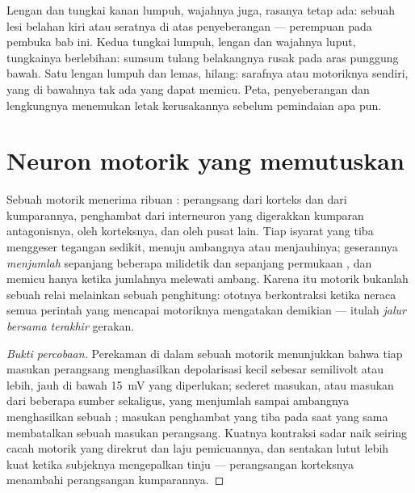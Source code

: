 \begin{example}\label{ex:g12:brain-and-movement:paralysis}
Lengan dan tungkai kanan lumpuh, wajahnya juga, rasanya tetap ada:
sebuah lesi  belahan kiri atau seratnya di atas
penyeberangan --- perempuan pada pembuka bab ini. Kedua tungkai lumpuh,
lengan dan wajahnya luput,  tungkainya berlebihan: sumsum tulang
belakangnya rusak pada aras punggung bawah. Satu lengan lumpuh dan
lemas,  hilang: sarafnya atau  motoriknya sendiri, yang
di bawahnya tak ada yang dapat memicu. Peta, penyeberangan dan
lengkungnya menemukan letak kerusakannya sebelum pemindaian apa pun.
\end{example}

\section{Neuron motorik yang memutuskan}

\begin{proposition}\label{prop:g12:brain-and-movement:integration}
Sebuah  motorik menerima ribuan :  perangsang
dari korteks dan dari kumparannya,  penghambat dari interneuron
yang digerakkan kumparan antagonisnya, oleh korteksnya, dan oleh pusat
lain. Tiap isyarat yang tiba menggeser tegangan  sedikit,
menuju ambangnya atau menjauhinya; geserannya \emph{menjumlah}
sepanjang beberapa milidetik dan sepanjang permukaan , dan
 memicu hanya ketika jumlahnya melewati ambang. Karena itu
 motorik bukanlah sebuah relai melainkan sebuah penghitung:
ototnya berkontraksi ketika neraca semua perintah yang mencapai 
motoriknya mengatakan demikian --- itulah \emph{jalur bersama
terakhir} gerakan.
\end{proposition}
\begin{proof}[Bukti percobaan]
Perekaman di dalam sebuah  motorik menunjukkan bahwa tiap
masukan perangsang menghasilkan depolarisasi kecil sebesar semilivolt
atau lebih, jauh di bawah \qty{15}{mV} yang diperlukan; sederet masukan,
atau masukan dari beberapa sumber sekaligus, yang menjumlah sampai
ambangnya menghasilkan sebuah ; masukan penghambat yang
tiba pada saat yang sama membatalkan sebuah masukan perangsang. Kuatnya
kontraksi sadar naik seiring cacah  motorik yang direkrut dan
laju pemicuannya, dan sentakan lutut lebih kuat ketika subjeknya
mengepalkan tinju --- perangsangan korteksnya menambahi perangsangan
kumparannya.
\end{proof}

